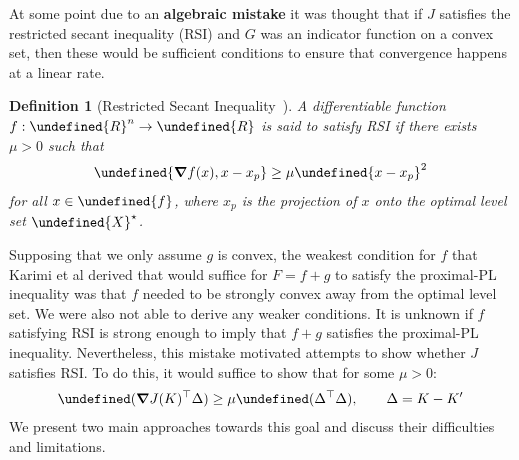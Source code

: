 \documentclass[11pt]{article}  %
\newtheorem{definition}{Definition}
\let\mbb\undefined
\newcommand{\mbb}[1]{\mathbb{#1}}
\let\mcal\undefined
\newcommand{\mcal}[1]{\mathcal{#1}}
\let\angles\undefined
\newcommand{\angles}[1]{\langle#1\rangle}
\let\norm\undefined
\newcommand{\norm}[1]{\lVert #1 \rVert}
\let\dom\undefined
\DeclareMathOperator{\dom}{dom}
\let\Tr\undefined
\DeclareMathOperator{\Tr}{Tr}
\begin{document}
At some point due to an \textbf{algebraic mistake} it was thought that if 
\(J\) satisfies the restricted secant inequality (RSI)
and \(G\) was an indicator function on a convex set,
then these would be sufficient conditions to ensure that
convergence happens at a linear rate.

\begin{definition}[Restricted Secant Inequality~\cite{karimi2016linear}]
  A differentiable function \(f : \mbb{R}^n \to \mbb{R}\)
  is said to satisfy RSI if
  there exists \(\mu > 0\) such that
  \begin{align}
    \angles{\grad f(x), x - x_p} \geq \mu \norm{x - x_p}^2
  \end{align}
  for all \(x \in \dom{f}\), where \(x_p\) is the projection of \(x\)
  onto the optimal level set \(\mcal{X}^\star\).
\end{definition}

Supposing that we only assume \(g\) is convex,
the weakest condition for \(f\) that Karimi et al derived
that would suffice for \(F = f + g\) to satisfy the proximal-PL inequality
was that \(f\) needed to be strongly convex away from the optimal level set.
We were also not able to derive any weaker conditions.
It is unknown if \(f\) satisfying RSI is strong enough to imply that
\(f + g\) satisfies the proximal-PL inequality.
Nevertheless, this mistake motivated attempts to show whether \(J\)
satisfies RSI.
To do this, it would suffice to show that
for some \(\mu > 0\):
\begin{align}
  \Tr (\grad J(K) ^\top \Delta) \geq \mu \Tr (\Delta^\top \Delta),
    \qquad
    \Delta = K - K^\prime
\end{align}
We present two main approaches towards this goal
and discuss their difficulties and limitations.
\end{document}
